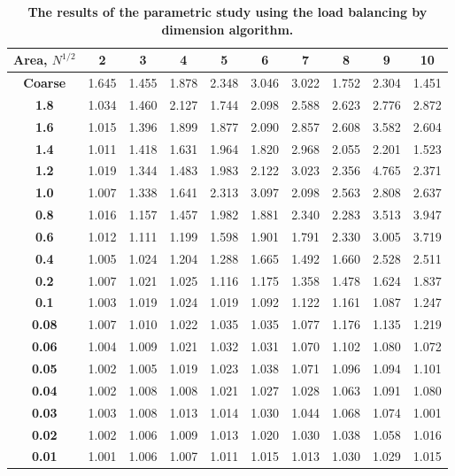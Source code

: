 \documentclass[letterpaper]{mandc2019}
\begin{document}
{\begin{table}[htb]
{\begin{tabular}{c|c|c|c|c|c|c|c|c|c}
\end{tabular}}
\label{all_improvements}
\end{table}

\begin{table}[htb]
\centering
  \caption{\bf The results of the parametric study using the load balancing by dimension algorithm.}
  \begin{tabular}{c|c|c|c|c|c|c|c|c|c} 
\bf Area, $N^{1/2}$ & \bf  2 & \bf 3    &  \bf  4   &  \bf  5   &  \bf 6    &  \bf  7   &   \bf 8   &  \bf 9    &  \bf 10   \\ \hline \hline
\bf Coarse & 1.645 & 1.455 & 1.878 & 2.348 & 3.046 & 3.022 & 1.752 & 2.304 & 1.451 \\ \hline 
\bf 1.8& 1.034 & 1.460 & 2.127 & 1.744 & 2.098 & 2.588 & 2.623 & 2.776 & 2.872 \\ \hline
\bf 1.6& 1.015 & 1.396 & 1.899 & 1.877 & 2.090 & 2.857 & 2.608 & 3.582 & 2.604 \\ \hline
\bf 1.4& 1.011 & 1.418 & 1.631 & 1.964 & 1.820 & 2.968 & 2.055 & 2.201 & 1.523 \\ \hline
\bf 1.2& 1.019 & 1.344 & 1.483 & 1.983 & 2.122 & 3.023 & 2.356 & \cellcolor{blue!25}4.765 & 2.371 \\ \hline
\bf 1.0& 1.007 & 1.338 & 1.641 & 2.313 & 3.097 & 2.098 & 2.563 & 2.808 & 2.637 \\ \hline
\bf 0.8& 1.016 & 1.157 & 1.457 & 1.982 & 1.881 & 2.340 & 2.283 & 3.513 & 3.947 \\ \hline
\bf 0.6& 1.012 & 1.111 & 1.199 & 1.598 & 1.901 & 1.791 & 2.330 & 3.005 & 3.719 \\ \hline
\bf 0.4& 1.005 & 1.024 & 1.204 & 1.288 & 1.665 & 1.492 & 1.660 & 2.528 & 2.511 \\ \hline
\bf 0.2& 1.007 & 1.021 & 1.025 & 1.116 & 1.175 & 1.358 & 1.478 & 1.624 & 1.837 \\ \hline
\bf 0.1& 1.003 & 1.019 & 1.024 & 1.019 & 1.092 & 1.122 & 1.161 & 1.087 & 1.247 \\ \hline
\bf 0.08& 1.007 & 1.010 & 1.022 & 1.035 & 1.035 & 1.077 & 1.176 & 1.135 & 1.219 \\ \hline
\bf 0.06& 1.004 & 1.009 & 1.021 & 1.032 & 1.031 & 1.070 & 1.102 & 1.080 & 1.072 \\ \hline
\bf 0.05& 1.002 & 1.005 & 1.019 & 1.023 & 1.038 & 1.071 & 1.096 & 1.094 & 1.101 \\ \hline
\bf 0.04& 1.002 & 1.008 & 1.008 & 1.021 & 1.027 & 1.028 & 1.063 & 1.091 & 1.080 \\ \hline
\bf 0.03& 1.003 & 1.008 & 1.013 & 1.014 & 1.030 & 1.044 & 1.068 & 1.074 & \cellcolor{red!25}1.001 \\ \hline
\bf 0.02& 1.002 & 1.006 & 1.009 & 1.013 & 1.020 & 1.030 & 1.038 & 1.058 & 1.016 \\ \hline
\bf 0.01& \cellcolor{red!25}1.001 & 1.006 & 1.007 & 1.011 & 1.015 & 1.013 & 1.030 & 1.029 & 1.015 \\ \hline


\end{tabular}
\end{table}}
\end{document}
